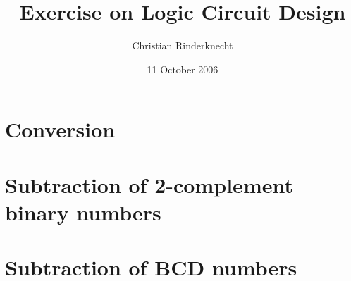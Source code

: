 \documentclass[11pt,a4paper]{article}
\title{Exercise on Logic Circuit Design}
\author{Christian Rinderknecht}
\date{11 October 2006}
\begin{document}
\maketitle
\thispagestyle{empty}

\section{Conversion}



\section{Subtraction of 2-complement binary numbers}



\section{Subtraction of BCD numbers}


\end{document}
